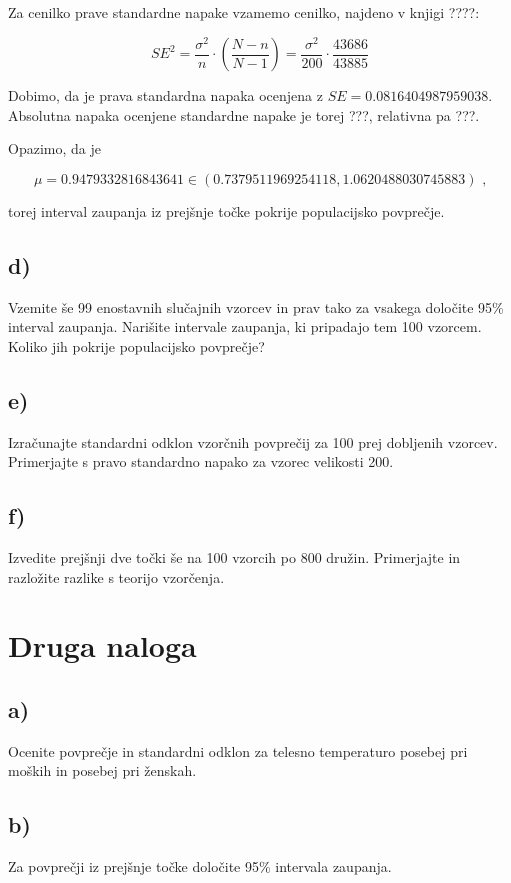 \documentclass[12pt, a4paper]{article}
\begin{document}
Za cenilko prave standardne napake vzamemo cenilko, najdeno v knjigi ????:

$$ SE^2 = \frac{\sigma^2}{n} \cdot (\frac{N-n}{N-1}) = \frac{\sigma^2}{200} \cdot \frac{43686}{43885}
$$

Dobimo, da je prava standardna napaka ocenjena z $SE = 0.0816404987959038$. Absolutna
napaka ocenjene standardne napake je torej ???, relativna pa ???.

Opazimo, da je

$$ \mu = 0.9479332816843641 \in (0.7379511969254118, 1.0620488030745883) \text{ ,}
$$

torej interval zaupanja iz prejšnje točke pokrije populacijsko povprečje.

\subsection{d)}
Vzemite še 99 enostavnih slučajnih vzorcev in prav tako za vsakega določite
95\% interval zaupanja. Narišite intervale zaupanja, ki pripadajo tem 100 
vzorcem. Koliko jih pokrije populacijsko povprečje?

\subsection{e)}
Izračunajte standardni odklon vzorčnih povprečij za 100 prej dobljenih 
vzorcev. Primerjajte s pravo standardno napako za vzorec velikosti 200.

\subsection{f)}
Izvedite prejšnji dve točki še na 100 vzorcih po 800 družin. Primerjajte 
in razložite razlike s teorijo vzorčenja.



\section{Druga naloga}

\subsection{a)}
Ocenite povprečje in standardni odklon za telesno temperaturo posebej pri
moških in posebej pri ženskah.

\subsection{b)}
Za povprečji iz prejšnje točke določite 95\% intervala zaupanja.
\end{document}
